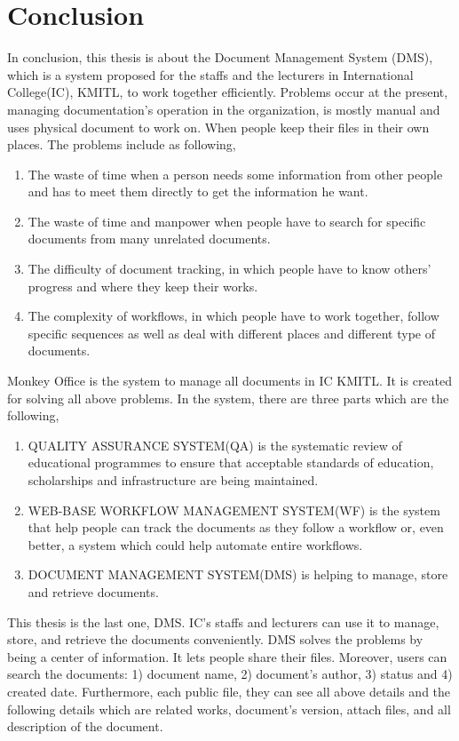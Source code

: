\chapter{Conclusion}

In conclusion, this thesis is about the Document Management System (DMS), which is a system proposed for the staffs and the lecturers in International College(IC), KMITL, to work together efficiently. Problems occur at the present, managing documentation's operation in the organization, is mostly manual and uses physical document to work on. When people keep their files in their own places. The problems include as following,
\begin{enumerate}
\item The waste of time when a person needs some information from other people and has to meet them directly to get the information he want.
\item The waste of time and manpower when people have to search for specific documents from many unrelated documents.
\item The difficulty of document tracking, in which people have to know others' progress and where they keep their works.
\item The complexity of workflows, in which people have to work together, follow specific sequences as well as deal with different places and different type of documents.
\end{enumerate} 


Monkey Office is the system to manage all documents in IC KMITL. It is created for solving all above problems. In the system, there are three parts which are the following,
\begin{enumerate}
	\item QUALITY ASSURANCE SYSTEM(QA) is the systematic review of educational programmes to ensure that acceptable standards of education, scholarships and infrastructure are being maintained. 

	\item WEB-BASE WORKFLOW MANAGEMENT SYSTEM(WF) is the system that help people can track the documents as they follow a workflow or, even better, a system which could help automate entire workflows. 

	\item DOCUMENT MANAGEMENT SYSTEM(DMS) is helping to manage, store and retrieve documents. 
\end{enumerate}

This thesis is the last one, DMS. IC's staffs and lecturers can use it to manage, store, and retrieve the documents conveniently. DMS solves the problems by being a center of information. It lets people share their files. Moreover, users can search the documents: 1) document name, 2) document's author, 3) status and 4) created date.
Furthermore, each public file, they can see all above details and the following details which are related works, document's version, attach files, and all description of the document. %


